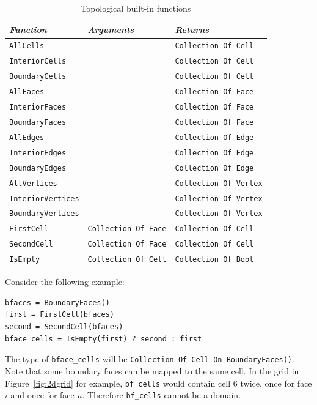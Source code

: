 \documentclass[11pt]{article}
\newcommand{\code}[1]{\texttt{#1}}
\begin{document}
\begin{table}
\begin{tabular}{l|l|l}
{\em Function} & {\em Arguments} & {\em Returns} \\
\hline
\code{AllCells} & & \code{Collection Of Cell} \\
\code{InteriorCells} & & \code{Collection Of Cell} \\
\code{BoundaryCells} & & \code{Collection Of Cell} \\
\code{AllFaces} & & \code{Collection Of Face} \\
\code{InteriorFaces} & & \code{Collection Of Face} \\
\code{BoundaryFaces} & & \code{Collection Of Face} \\
\code{AllEdges} & & \code{Collection Of Edge} \\
\code{InteriorEdges} & & \code{Collection Of Edge} \\
\code{BoundaryEdges} & & \code{Collection Of Edge} \\
\code{AllVertices} & & \code{Collection Of Vertex} \\
\code{InteriorVertices} & & \code{Collection Of Vertex} \\
\code{BoundaryVertices} & & \code{Collection Of Vertex} \\
\code{FirstCell} & \code{Collection Of Face} & \code{Collection Of Cell}  \\
\code{SecondCell} & \code{Collection Of Face} & \code{Collection Of Cell}  \\
\code{IsEmpty} & \code{Collection Of Cell} & \code{Collection Of Bool}  \\
\end{tabular}
\caption{Topological built-in functions}
\label{tab:topfunc}
\end{table}

Consider the following example:

\begin{verbatim}
bfaces = BoundaryFaces()
first = FirstCell(bfaces)
second = SecondCell(bfaces)
bface_cells = IsEmpty(first) ? second : first
\end{verbatim}

The type of \code{bface\_cells} will be \code{Collection Of Cell On BoundaryFaces()}. Note
that some boundary faces can be mapped to the same cell. In the grid in
Figure~\ref{fig:2dgrid} for example, \code{bf\_cells} would contain cell $6$ twice, once for
face $i$ and once for face $u$. Therefore \code{bf\_cells} cannot be a domain.
\end{document}
